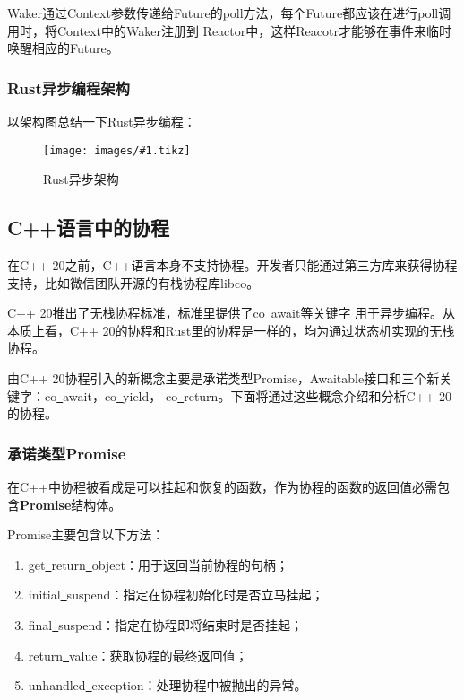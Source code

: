 \documentclass[supercite]{HustGraduPaper}
\newcommand{\cfig}[3]{
  \begin{figure}[htb]
    \centering
    \texttt{[image: images/\#1.tikz]}
    \caption{#3}
    \label{fig:#1}
  \end{figure}
}
\theoremstyle{definition}
\begin{document}
Waker通过Context参数传递给Future的poll方法，每个Future都应该在进行poll调用时，将Context中的Waker注册到
Reactor中，这样Reacotr才能够在事件来临时唤醒相应的Future。\par

\subsubsection{Rust异步编程架构}
以架构图总结一下Rust异步编程：

\cfig{rust-async}{0.9}{Rust异步架构}

\subsection{C++语言中的协程}
在C++ 20之前，C++语言本身不支持协程。开发者只能通过第三方库来获得协程支持，比如微信团队开源的有栈协程库libco。\par

C++ 20推出了无栈协程标准，标准里提供了co\underline{~}await等关键字
用于异步编程。从本质上看，C++ 20的协程和Rust里的协程是一样的，均为通过状态机实现的无栈协程。\par

由C++ 20协程引入的新概念主要是承诺类型Promise，Awaitable接口和三个新关键字：co\underline{~}await，co\underline{~}yield，
co\underline{~}return。下面将通过这些概念介绍和分析C++ 20的协程。\par

\subsubsection{承诺类型Promise}

在C++中协程被看成是可以挂起和恢复的函数，作为协程的函数的返回值必需包含\textbf{Promise}结构体。\par

Promise主要包含以下方法：

\begin{enumerate}
  \item get\underline{~}return\underline{~}object：用于返回当前协程的句柄；
  \item initial\underline{~}suspend：指定在协程初始化时是否立马挂起；
  \item final\underline{~}suspend：指定在协程即将结束时是否挂起；
  \item return\underline{~}value：获取协程的最终返回值；
  \item unhandled\underline{~}exception：处理协程中被抛出的异常。
\end{enumerate}
\end{document}
